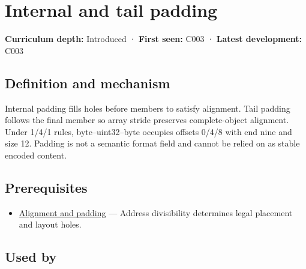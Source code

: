 \hypertarget{appendix-f52f8c5a3afd}{}\label{referencestart:appendix-f52f8c5a3afd}
\section{Internal and tail padding}\label{appendix-f52f8c5a3afd-internal-and-tail-padding}

\hypertarget{appendix-f52f8c5a3afd-internal-and-tail-padding}{}

\textbf{Curriculum depth:} Introduced · \textbf{First seen:} C003 · \textbf{Latest development:} C003

\begin{allmightroledefinition}

\subsection{Definition and mechanism}\label{appendix-f52f8c5a3afd-definition-and-mechanism}

\hypertarget{appendix-f52f8c5a3afd-definition-and-mechanism}{}

Internal padding fills holes before members to satisfy alignment. Tail padding follows the final member so array stride preserves complete-object alignment. Under 1/4/1 rules, byte--uint32--byte occupies offsets 0/4/8 with end nine and size 12. Padding is not a semantic format field and cannot be relied on as stable encoded content.

\end{allmightroledefinition}

\subsection{Prerequisites}\label{appendix-f52f8c5a3afd-prerequisites}

\hypertarget{appendix-f52f8c5a3afd-prerequisites}{}

\begin{itemize}
\tightlist
\item
  \hyperref[appendix-a1f7c53b4742]{Alignment and padding} --- Address divisibility determines legal placement and layout holes.
\end{itemize}

\subsection{Used by}\label{appendix-f52f8c5a3afd-used-by}

\hypertarget{appendix-f52f8c5a3afd-used-by}{}


